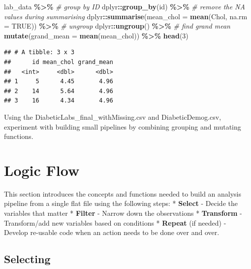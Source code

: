 \documentclass[
]{book}
\newenvironment{Shaded}{\begin{snugshade}}{\end{snugshade}}
\newcommand{\AttributeTok}[1]{\textcolor[rgb]{0.13,0.29,0.53}{#1}}
\newcommand{\CommentTok}[1]{\textcolor[rgb]{0.56,0.35,0.01}{\textit{#1}}}
\newcommand{\ConstantTok}[1]{\textcolor[rgb]{0.56,0.35,0.01}{#1}}
\newcommand{\DecValTok}[1]{\textcolor[rgb]{0.00,0.00,0.81}{#1}}
\newcommand{\FunctionTok}[1]{\textcolor[rgb]{0.13,0.29,0.53}{\textbf{#1}}}
\newcommand{\NormalTok}[1]{#1}
\newcommand{\SpecialCharTok}[1]{\textcolor[rgb]{0.81,0.36,0.00}{\textbf{#1}}}
\begin{document}
\begin{Shaded}
\begin{Highlighting}[]
\NormalTok{lab\_data }\SpecialCharTok{\%\textgreater{}\%} 
    \CommentTok{\# group by ID}
\NormalTok{    dplyr}\SpecialCharTok{::}\FunctionTok{group\_by}\NormalTok{(id) }\SpecialCharTok{\%\textgreater{}\%} 
    \CommentTok{\# remove the NA values during summarising}
\NormalTok{    dplyr}\SpecialCharTok{::}\FunctionTok{summarise}\NormalTok{(}\AttributeTok{mean\_chol =} \FunctionTok{mean}\NormalTok{(Chol, }\AttributeTok{na.rm =} \ConstantTok{TRUE}\NormalTok{)) }\SpecialCharTok{\%\textgreater{}\%} 
    \CommentTok{\# ungroup }
\NormalTok{    dplyr}\SpecialCharTok{::}\FunctionTok{ungroup}\NormalTok{() }\SpecialCharTok{\%\textgreater{}\%} 
    \CommentTok{\# find grand mean}
    \FunctionTok{mutate}\NormalTok{(}\AttributeTok{grand\_mean =} \FunctionTok{mean}\NormalTok{(mean\_chol)) }\SpecialCharTok{\%\textgreater{}\%}
    \FunctionTok{head}\NormalTok{(}\DecValTok{3}\NormalTok{)}
\end{Highlighting}
\end{Shaded}

\begin{verbatim}
## # A tibble: 3 x 3
##      id mean_chol grand_mean
##   <int>     <dbl>      <dbl>
## 1     5      4.45       4.96
## 2    14      5.64       4.96
## 3    16      4.34       4.96
\end{verbatim}

Using the DiabeticLabs\_final\_withMissing.csv and DiabeticDemog.csv, experiment with building small pipelines by combining grouping and mutating functions.

\section{Logic Flow}\label{sec:logicFlow}

This section introduces the concepts and functions needed to build an analysis pipeline from a single flat file using the following steps:
* \textbf{Select} - Decide the variables that matter
* \textbf{Filter} - Narrow down the observations
* \textbf{Transform} - Transform/add new variables based on conditions
* \textbf{Repeat} (if needed) - Develop re-usable code when an action needs to be done over and over.

\subsection{Selecting}\label{sec:selecting}
\end{document}

